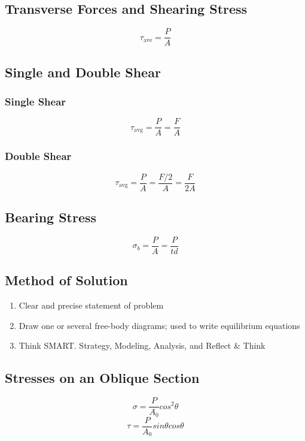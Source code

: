 \documentclass[10pt,landscape]{article}
\begin{document}
\begin{multicols}{3}
\subsection{Transverse Forces and Shearing Stress}
\begin{equation}
    \tau_{\text{ave}}=\frac{P}{A}
\end{equation}
\subsection{Single and Double Shear}
\subsubsection{Single Shear}
\begin{equation}
    \tau_{\text{avg}}=\frac{P}{A}=\frac{F}{A}
\end{equation}
\subsubsection{Double Shear}
\begin{equation}
    \tau_{\text{avg}}=\frac{P}{A}=\frac{F/2}{A}=\frac{F}{2A}    
\end{equation}
\subsection{Bearing Stress}
\begin{equation}
    \sigma_b=\frac{P}{A}=\frac{P}{td}
\end{equation}
\subsection{Method of Solution}
\begin{enumerate}
  \item Clear and precise statement of problem
  \item Draw one or several free-body diagrams; used to write equilibrium equations
  \item Think SMART. Strategy, Modeling, Analysis, and Reflect \& Think
\end{enumerate}
\subsection{Stresses on an Oblique Section}
\begin{equation}
    \sigma=\frac{P}{A_0}cos^2\theta
\end{equation}
\begin{equation}
    \tau=\frac{P}{A_0}sin\theta cos\theta
\end{equation}

\end{multicols}
\end{document}
